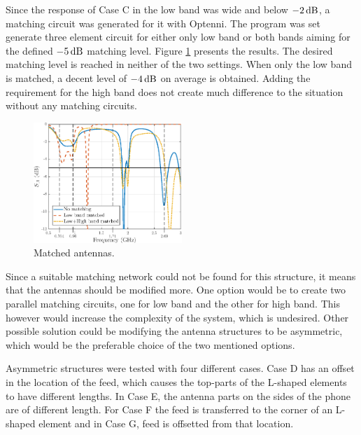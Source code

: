 Since the response of Case C in the low band was wide and below $-2\,\mathrm{dB}$, a matching circuit was generated for it with Optenni. The program was set generate three element circuit for either only low band or both bands aiming for the defined $-5\,\mathrm{dB}$ matching level. Figure \ref{fig:concept2_match} presents the results. The desired matching level is reached in neither of the two settings. When only the low band is matched, a decent level of $-4\,\mathrm{dB}$ on average is obtained. Adding the requirement for the high band does not create much difference to the situation without any matching circuits. 
\begin{figure}[H]
    \centering
    \includegraphics[width=0.5\textwidth]{img/concept2_match.eps}
    \caption{Matched antennas.}
    \label{fig:concept2_match}
\end{figure}

Since a suitable matching network could not be found for this structure, it means that the antennas should be modified more. One option would be to create two parallel matching circuits, one for low band and the other for high band. This however would increase the complexity of the system, which is undesired. Other possible solution could be modifying the antenna structures to be asymmetric, which would be the preferable choice of the two mentioned options.

Asymmetric structures were tested with four different cases. Case D has an offset in the location of the feed, which causes the top-parts of the L-shaped elements to have different lengths. In Case E, the antenna parts on the sides of the phone are of different length. For Case F the feed is transferred to the corner of an L-shaped element and in Case G, feed is offsetted from that location.

